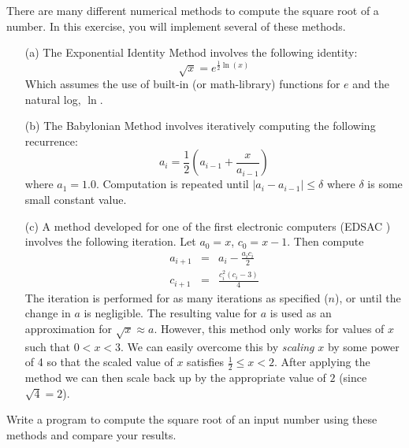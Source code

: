 \begin{exer}
There are many different numerical methods to compute the square root of a number.  In
this exercise, you will implement several of these methods.

\begin{enumerate}
  \item[(a)] The Exponential Identity Method involves the following identity:
           $$\sqrt{x} = e^{\frac{1}{2}\ln{(x)}}$$
	Which assumes the use of built-in (or math-library) functions for $e$ and the natural log, $\ln$.
  \item[(b)] The Babylonian Method involves iteratively computing the following recurrence:
	$$a_{i} = \frac{1}{2}\left( a_{i-1} + \frac{x}{a_{i-1}} \right)$$
	where $a_1 = 1.0$.  Computation is repeated until $|a_{i} - a_{i-1}| \leq \delta$ where 
	$\delta$ is some small constant value.
  \item[(c)] A method developed for one of the first electronic computers (EDSAC \cite{WilkesWheelerGill1952}) involves the following iteration.
	Let $a_0 = x$, $c_0 = x-1$.  Then compute
	$$\begin{array}{rcl}
	    a_{i+1} & = & a_i - \frac{a_ic_i}{2} \\
	    c_{i+1} & = & \frac{c_i^2(c_i - 3)}{4} 
 	\end{array}$$
	The iteration is performed for as many iterations as specified ($n$), or until the change in $a$ is negligible.
	The resulting value for $a$ is used as an approximation for $\sqrt{x} \approx a$.
	However, this method only works for values of $x$ such that $0 < x < 3$.  
	We can easily overcome this by \emph{scaling} $x$ by some power of 4 so that
	the scaled value of $x$ satisfies $\frac{1}{2} \leq x < 2$.  After applying the method we
	can then scale back up by the appropriate value of $2$ (since $\sqrt{4} = 2$).  
\end{enumerate}

Write a program to compute the square root of an input number using these methods and compare your results.
\end{exer}

